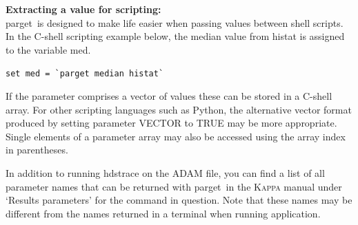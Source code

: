\documentclass[twoside,11pt]{article}
\newcommand{\xref}[3]{#1}
\renewcommand{\_}{\texttt{\symbol{95}}}
\newcommand{\task}[1]{\textsf{#1}}
\newcommand{\parget}{\xref{\task{parget}}{sun95}{PARGET}}
\begin{document}
 \textbf{Extracting a value for scripting:}\\
\parget\ is designed to make life easier when passing values between shell scripts. In the C-shell scripting example below, the  median value from \task{histat} is assigned to the variable med.
\vspace{0.3cm}

\texttt{set med = \`{}parget median histat\`{}}
\vspace{0.3cm}

If the parameter comprises a vector of values these can be stored in a C-shell array. For other scripting languages such as Python, the alternative vector format produced by setting parameter VECTOR to TRUE may be more appropriate. Single elements of a parameter array may also be accessed using the array index in parentheses.

In addition to running \task{hdstrace} on the ADAM file, you can find a list of all parameter names that can be returned with \parget\ in the \xref{\textsc{Kappa} manual}{sun95}{} under `Results parameters'  for the command in question. Note that these names may be different from the names returned in a terminal when running application.
\end{document}
